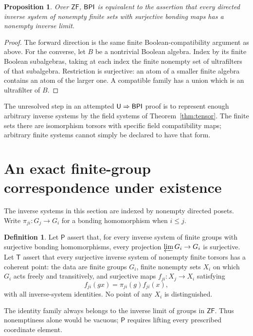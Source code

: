 \documentclass[11pt,a4paper]{article}
\newtheorem{proposition}[theorem]{Proposition}
\theoremstyle{definition}\newtheorem{definition}[theorem]{Definition}
\theoremstyle{remark}\newtheorem{remark}[theorem]{Remark}
\newcommand{\ZF}{\mathsf{ZF}}\newcommand{\ZFA}{\mathsf{ZFA}}
\begin{document}
\begin{proposition}\label{prop:ilbpi}
Over $\ZF$, $\mathsf{BPI}$ is equivalent to the assertion that every directed inverse system of nonempty finite sets with surjective bonding maps has a nonempty inverse limit.
\end{proposition}
\begin{proof}
The forward direction is the same finite Boolean-compatibility argument as above. For the converse, let $B$ be a nontrivial Boolean algebra. Index by its finite Boolean subalgebras, taking at each index the finite nonempty set of ultrafilters of that subalgebra. Restriction is surjective: an atom of a smaller finite algebra contains an atom of the larger one. A compatible family has a union which is an ultrafilter of $B$.
\end{proof}

The unresolved step in an attempted $\mathsf U\Rightarrow\mathsf{BPI}$ proof is to represent enough arbitrary inverse systems by the field systems of Theorem~\ref{thm:tensor}. The finite sets there are isomorphism torsors with specific field compatibility maps; arbitrary finite systems cannot simply be declared to have that form.

\section{An exact finite-group correspondence under existence}\label{sec:finitegroups}
The inverse systems in this section are indexed by nonempty directed posets. Write $\pi_{ji}:G_j\to G_i$ for a bonding homomorphism when $i\leq j$.

\begin{definition}
Let $\mathsf P$ assert that, for every inverse system of finite groups with surjective bonding homomorphisms, every projection $\varprojlim G_i\to G_i$ is surjective. Let $\mathsf T$ assert that every surjective inverse system of nonempty finite torsors has a coherent point: the data are finite groups $G_i$, finite nonempty sets $X_i$ on which $G_i$ acts freely and transitively, and surjective maps $f_{ji}:X_j\to X_i$ satisfying
\[
f_{ji}(g x)=\pi_{ji}(g)f_{ji}(x),
\]
with all inverse-system identities. No point of any $X_i$ is distinguished.
\end{definition}
The identity family always belongs to the inverse limit of groups in $\ZF$. Thus nonemptiness alone would be vacuous; $\mathsf P$ requires lifting every prescribed coordinate element.
\end{document}
